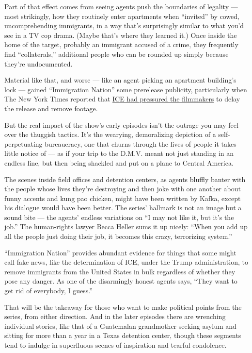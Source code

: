 Part of that effect comes from seeing agents push the boundaries of
legality --- most strikingly, how they routinely enter apartments when
``invited'' by cowed, uncomprehending immigrants, in a way that's
surprisingly similar to what you'd see in a TV cop drama. (Maybe that's
where they learned it.) Once inside the home of the target, probably an
immigrant accused of a crime, they frequently find ``collaterals,''
additional people who can be rounded up simply because they're
undocumented.

Material like that, and worse --- like an agent picking an apartment
building's lock --- gained ``Immigration Nation'' some prerelease
publicity, particularly when The New York Times reported that
\href{https://www.nytimes3xbfgragh.onion/2020/07/23/us/trump-immigration-nation-netflix.html}{ICE
had pressured the filmmakers} to delay the release and remove footage.

But the real impact of the show's early episodes isn't the outrage you
may feel over the thuggish tactics. It's the wearying, demoralizing
depiction of a self-perpetuating bureaucracy, one that churns through
the lives of people it takes little notice of --- as if your trip to the
D.M.V. meant not just standing in an endless line, but then being
shackled and put on a plane to Central America.

The scenes inside field offices and detention centers, as agents bluffly
banter with the people whose lives they're destroying and then joke with
one another about funny accents and kung pao chicken, might have been
written by Kafka, except his dialogue would have been better. The
series' hallmark is not an image but a sound bite --- the agents'
endless variations on ``I may not like it, but it's the job.'' The
human-rights lawyer Becca Heller sums it up nicely: ``When you add up
all the people just doing their job, it becomes this crazy, terrorizing
system.''

``Immigration Nation'' provides abundant evidence for things that some
might call fake news, like the determination of ICE, under the Trump
administration, to remove immigrants from the United States in bulk
regardless of whether they pose any danger. As one of the disarmingly
honest agents says, ``They want to get rid of everybody, I guess.''

That will be the takeaway for those who want to make political points
from the series, from either direction. And in the later episodes there
are wrenching individual stories, like that of a Guatemalan grandmother
seeking asylum and sitting for more than a year in a Texas detention
center, though these segments tend to indulge in superfluous scenes of
inspiration and tearful condolence.

